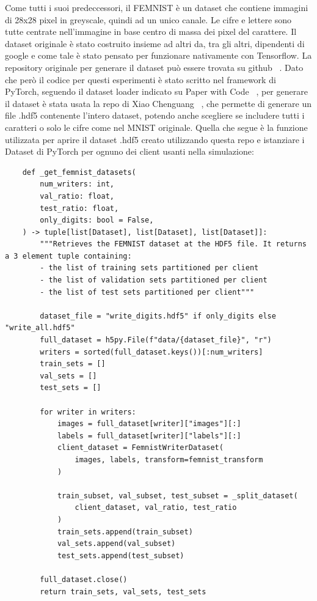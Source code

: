 Come tutti i suoi predeccessori, il FEMNIST è un dataset che contiene
immagini di 28x28 pixel in greyscale, quindi ad un unico canale. Le
cifre e lettere sono tutte centrate nell'immagine in base centro di 
massa dei pixel del carattere.
Il dataset originale è stato costruito insieme ad altri da, tra gli 
altri, dipendenti di google e come tale è stato pensato per funzionare
nativamente con Tensorflow. La repository originale per generare il
dataset può essere trovata su github ~\cite{leaf_repo}. Dato che però
il codice per questi esperimenti è stato scritto nel framework di PyTorch,
seguendo il dataset loader indicato su Paper with Code ~\cite{femnist_pwc},
per generare il dataset è stata usata la repo di Xiao Chenguang 
~\cite{femnist_hdf5}, che permette di generare un file .hdf5 contenente
l'intero dataset, potendo anche scegliere se includere tutti i caratteri
o solo le cifre come nel MNIST originale. Quella che segue è la funzione
utilizzata per aprire il dataset .hdf5 creato utilizzando questa repo
e istanziare i Dataset di PyTorch per ognuno dei client usanti nella
simulazione:

\lstset{style=mypython}
\begin{lstlisting}
    def _get_femnist_datasets(
        num_writers: int,
        val_ratio: float,
        test_ratio: float,
        only_digits: bool = False,
    ) -> tuple[list[Dataset], list[Dataset], list[Dataset]]:
        """Retrieves the FEMNIST dataset at the HDF5 file. It returns a 3 element tuple containing:
        - the list of training sets partitioned per client
        - the list of validation sets partitioned per client
        - the list of test sets partitioned per client"""
    
        dataset_file = "write_digits.hdf5" if only_digits else "write_all.hdf5"
        full_dataset = h5py.File(f"data/{dataset_file}", "r")
        writers = sorted(full_dataset.keys())[:num_writers]
        train_sets = []
        val_sets = []
        test_sets = []
    
        for writer in writers:
            images = full_dataset[writer]["images"][:]
            labels = full_dataset[writer]["labels"][:]
            client_dataset = FemnistWriterDataset(
                images, labels, transform=femnist_transform
            )
    
            train_subset, val_subset, test_subset = _split_dataset(
                client_dataset, val_ratio, test_ratio
            )
            train_sets.append(train_subset)
            val_sets.append(val_subset)
            test_sets.append(test_subset)
    
        full_dataset.close()
        return train_sets, val_sets, test_sets
\end{lstlisting}


